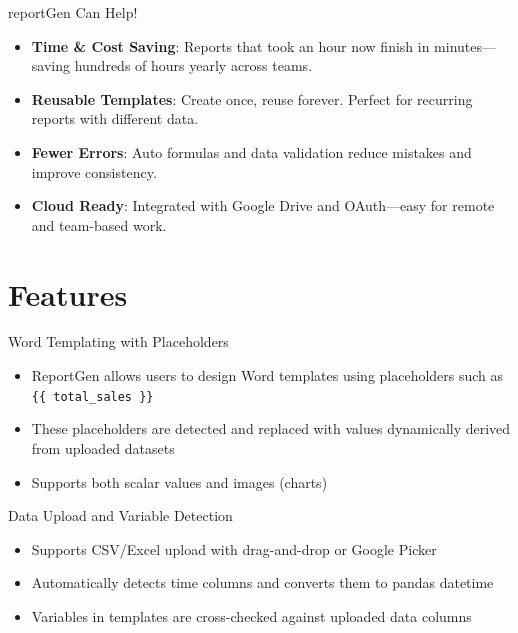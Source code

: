 \documentclass[handout, 12pt]{beamer}
\begin{document}
	\begin{frame}{reportGen Can Help!}
		\begin{itemize}
			\item \textbf{Time \& Cost Saving}: Reports that took an hour now finish in minutes—saving hundreds of hours yearly across teams.
			
			\item \textbf{Reusable Templates}: Create once, reuse forever. Perfect for recurring reports with different data.
			
			\item \textbf{Fewer Errors}: Auto formulas and data validation reduce mistakes and improve consistency.
			
			\item \textbf{Cloud Ready}: Integrated with Google Drive and OAuth—easy for remote and team-based work.
		\end{itemize}
	\end{frame}

	\section{Features}

	\begin{frame}{Word Templating with Placeholders}
		\begin{itemize}
		  \item ReportGen allows users to design Word templates using placeholders such as \texttt{\{\{ total\_sales \}\}}
		  \item These placeholders are detected and replaced with values dynamically derived from uploaded datasets
		  \item Supports both scalar values and images (charts)
		\end{itemize}
	\end{frame}

	\begin{frame}{Data Upload and Variable Detection}
		\begin{itemize}
		  \item Supports CSV/Excel upload with drag-and-drop or Google Picker
		  \item Automatically detects time columns and converts them to pandas datetime
		  \item Variables in templates are cross-checked against uploaded data columns
		\end{itemize}
	\end{frame}
\end{document}
